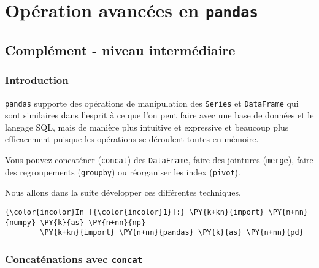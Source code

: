     
    
    
    

    

    \hypertarget{opuxe9ration-avancuxe9es-en-pandas}{%
\section{\texorpdfstring{Opération avancées en
\texttt{pandas}}{Opération avancées en pandas}}\label{opuxe9ration-avancuxe9es-en-pandas}}

    \hypertarget{compluxe9ment---niveau-intermuxe9diaire}{%
\subsection{Complément - niveau
intermédiaire}\label{compluxe9ment---niveau-intermuxe9diaire}}

    \hypertarget{introduction}{%
\subsubsection{Introduction}\label{introduction}}

    \texttt{pandas} supporte des opérations de manipulation des
\texttt{Series} et \texttt{DataFrame} qui sont similaires dans l'esprit
à ce que l'on peut faire avec une base de données et le langage SQL,
mais de manière plus intuitive et expressive et beaucoup plus
efficacement puisque les opérations se déroulent toutes en mémoire.

Vous pouvez concaténer (\texttt{concat}) des \texttt{DataFrame}, faire
des jointures (\texttt{merge}), faire des regroupements
(\texttt{groupby}) ou réorganiser les index (\texttt{pivot}).

Nous allons dans la suite développer ces différentes techniques.

    \begin{Verbatim}[commandchars=\\\{\},frame=single,framerule=0.3mm,rulecolor=\color{cellframecolor}]
{\color{incolor}In [{\color{incolor}1}]:} \PY{k+kn}{import} \PY{n+nn}{numpy} \PY{k}{as} \PY{n+nn}{np}
        \PY{k+kn}{import} \PY{n+nn}{pandas} \PY{k}{as} \PY{n+nn}{pd}
\end{Verbatim}


    \hypertarget{concatuxe9nations-avec-concat}{%
\subsubsection{\texorpdfstring{Concaténations avec
\texttt{concat}}{Concaténations avec concat}}\label{concatuxe9nations-avec-concat}}

